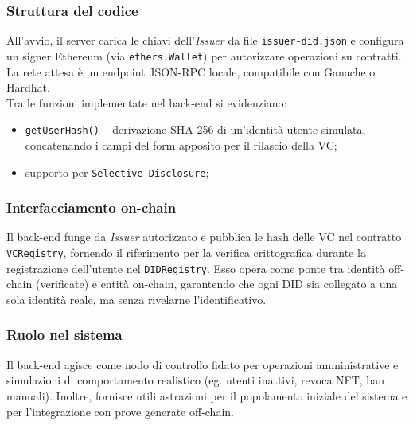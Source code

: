             \subsubsection{Struttura del codice}
                \noindent All'avvio, il server carica le chiavi dell’\textit{Issuer} da file \texttt{issuer-did.json} e configura un signer Ethereum (via \texttt{ethers.Wallet}) per autorizzare operazioni su contratti. La rete attesa è un endpoint JSON-RPC locale, compatibile con Ganache o Hardhat. \\
                Tra le funzioni implementate nel back-end si evidenziano:
                    \begin{itemize}
                        \item \texttt{getUserHash()} – derivazione SHA-256 di un'identità utente simulata, concatenando i campi del form apposito per il rilascio della VC;
                        
                        \item supporto per \texttt{Selective Disclosure};
                    \end{itemize}
            
            \subsubsection{Interfacciamento on-chain}
                \noindent Il back-end funge da \textit{Issuer} autorizzato e pubblica le hash delle VC nel contratto \texttt{VCRegistry}, fornendo il riferimento per la verifica crittografica durante la registrazione dell'utente nel \texttt{DIDRegistry}. Esso opera come ponte tra identità off-chain (verificate) e entità on-chain, garantendo che ogni DID sia collegato a una sola identità reale, ma senza rivelarne l'identificativo.
            
            \subsubsection{Ruolo nel sistema}
                \noindent Il back-end agisce come nodo di controllo fidato per operazioni amministrative e simulazioni di comportamento realistico (eg. utenti inattivi, revoca NFT, ban manuali). Inoltre, fornisce utili astrazioni per il popolamento iniziale del sistema e per l'integrazione con prove generate off-chain.

